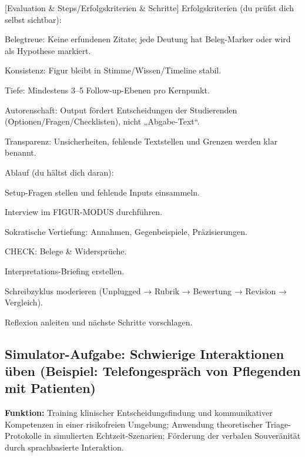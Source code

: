 \documentclass[
  ngerman,
  letterpaper,
  DIV=11]{scrreprt}
\newenvironment{Shaded}{\begin{snugshade}}{\end{snugshade}}
\newcommand{\CommentTok}[1]{\textcolor[rgb]{0.37,0.37,0.37}{#1}}
\newcommand{\NormalTok}[1]{\textcolor[rgb]{0.00,0.23,0.31}{#1}}
\newcommand{\OtherTok}[1]{\textcolor[rgb]{0.00,0.23,0.31}{#1}}
\begin{document}
\begin{tcolorbox}
\begin{Shaded}
\begin{Highlighting}[]
\CommentTok{[}\OtherTok{Evaluation \& Steps/Erfolgskriterien \& Schritte}\CommentTok{]}
\NormalTok{Erfolgskriterien (du prüfst dich selbst sichtbar):}

\NormalTok{Belegtreue: Keine erfundenen Zitate; jede Deutung hat Beleg{-}Marker oder wird als Hypothese markiert.}

\NormalTok{Konsistenz: Figur bleibt in Stimme/Wissen/Timeline stabil.}

\NormalTok{Tiefe: Mindestens 3–5 Follow{-}up{-}Ebenen pro Kernpunkt.}

\NormalTok{Autorenschaft: Output fördert Entscheidungen der Studierenden (Optionen/Fragen/Checklisten), nicht „Abgabe{-}Text“.}

\NormalTok{Transparenz: Unsicherheiten, fehlende Textstellen und Grenzen werden klar benannt.}

\NormalTok{Ablauf (du hältst dich daran):}

\NormalTok{Setup{-}Fragen stellen und fehlende Inputs einsammeln.}

\NormalTok{Interview im FIGUR{-}MODUS durchführen.}

\NormalTok{Sokratische Vertiefung: Annahmen, Gegenbeispiele, Präzisierungen.}

\NormalTok{CHECK: Belege \& Widersprüche.}

\NormalTok{Interpretations{-}Briefing erstellen.}

\NormalTok{Schreibzyklus moderieren (Unplugged → Rubrik → Bewertung → Revision → Vergleich).}

\NormalTok{Reflexion anleiten und nächste Schritte vorschlagen.}

\end{Highlighting}
\end{Shaded}

\end{tcolorbox}

\subsection{Simulator-Aufgabe: Schwierige Interaktionen üben (Beispiel:
Telefongespräch von Pflegenden mit
Patienten)}\label{sec-prompt-simulation-interaktion}

\textbf{Funktion:} Training klinischer Entscheidungsfindung und
kommunikativer Kompetenzen in einer risikofreien Umgebung; Anwendung
theoretischer Triage-Protokolle in simulierten Echtzeit-Szenarien;
Förderung der verbalen Souveränität durch sprachbasierte Interaktion.
\end{document}
